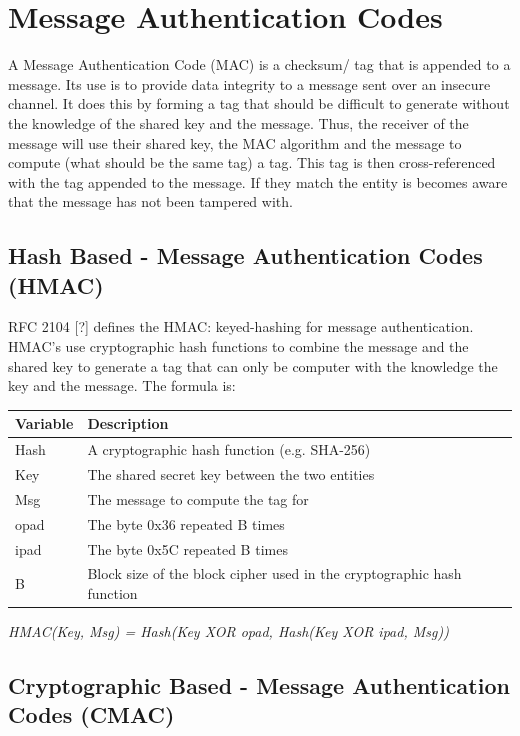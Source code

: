 \documentclass[bsc,frontabs,twoside,singlespacing,parskip,deptreport]{infthesis}     %
\begin{document}
\section{Message Authentication Codes}

A Message Authentication Code (MAC) is a checksum/ tag that is appended to a message. Its use is to provide data integrity to a message sent over an insecure channel. It does this by forming a tag that should be difficult to generate without the knowledge of the shared key and the message. Thus, the receiver of the message will use their shared key, the MAC algorithm and the message to compute (what should be the same tag) a tag. This tag is then cross-referenced with the tag appended to the message. If they match the entity is becomes aware that the message has not been tampered with.

\subsection{Hash Based - Message Authentication Codes (HMAC)}

RFC 2104 [?] defines the HMAC: keyed-hashing for message authentication. HMAC's use cryptographic hash functions to combine the message and the shared key to generate a tag that can only be computer with the knowledge the key and the message. The formula is:

\begin{table}[H]
\begin{tabular}{|l|l|}
\hline
Variable & Description\\
\hline
Hash & A cryptographic hash function (e.g. SHA-256)\\
\hline
Key & The shared secret key between the two entities\\
\hline
Msg & The message to compute the tag for\\
\hline
opad & The byte 0x36 repeated B times\\
\hline
ipad & The byte 0x5C repeated B times\\
\hline
B & Block size of the block cipher used in the cryptographic hash function\\
\hline
\end{tabular}
\end{table}

\begin{center}
\textit{HMAC(Key, Msg) = Hash(Key XOR opad, Hash(Key XOR ipad, Msg))}
\end{center}


\subsection{Cryptographic Based - Message Authentication Codes (CMAC)}
\end{document}
